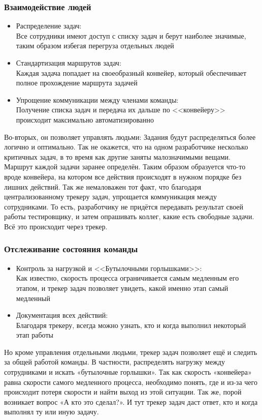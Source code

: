 \documentclass{../industrial-development}
\begin{document}
\begin{frame} \frametitle{Взаимодействие людей}
	\begin{itemize}
		\item Распределение задач:\\
		Все сотрудники имеют доступ с списку задач и берут наиболее значимые, таким образом избегая перегруза отдельных людей
		\item Стандартизация маршрутов задач:\\
		Каждая задача попадает на своеобразный конвейер, который обеспечивает полное прохождение маршрута задачей
		\item Упрощение коммуникации между членами команды:\\
		Получение списка задач и передача их дальше по <<конвейеру>> происходит максимально автоматизированно
	\end{itemize}
\end{frame}

\lecturenotes
Во-вторых, он позволяет управлять людьми:
Задания будут распределяться более логично и оптимально. Так не окажется, что на одном разработчике несколько критичных задач, в то время как другие заняты малозначимыми вещами.
Маршрут каждой задачи заранее определён. Таким образом образуется что-то вроде конвейера, на котором все действия происходят в нужном порядке без лишних действий.
Так же немаловажен тот факт, что благодаря централизованному трекеру задач, упрощается коммуникация между сотрудниками. То есть, разработчику не придётся передавать результат своей работы тестировщику, и затем опрашивать коллег, какие есть свободные задачи. Всё это происходит через трекер.

\begin{frame} \frametitle{Отслеживание состояния команды}
	\begin{itemize}
		\item Контроль за нагрузкой и <<Бутылочными горлышками>>:\\
		Как известно, скорость процесса ограничивается самым медленным его этапом, и трекер задач позволяет увидеть, какой именно этап самый медленный
		\item Документация всех действий:\\
		Благодаря трекеру, всегда можно узнать, кто и когда выполнил некоторый этап работы
	\end{itemize}
\end{frame}

\lecturenotes
Но кроме управления отдельными людьми, трекер задач позволяет ещё и следить за общей работой команды. В частности, распределять нагрузку между сотрудниками и искать «бутылочные горлышки». Так как скорость «конвейера» равна скорости самого медленного процесса, необходимо понять, где и из-за чего происходит потеря скорости и найти выход из этой ситуации.
Так же, порой возникает вопрос «А кто это сделал?». И тут трекер задач даст ответ, кто и когда выполнял ту или иную задачу.
\end{document}
